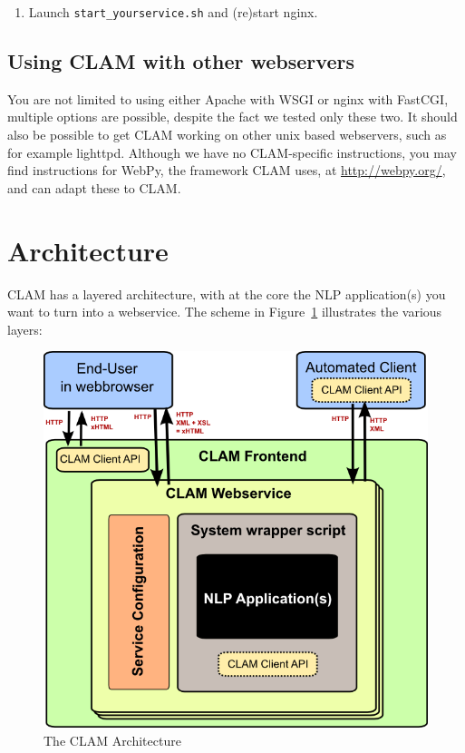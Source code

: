 \documentclass[a4paper,12pt]{report}
\begin{document}
\begin{enumerate}
\begin{verbatim}
 location /static/ {
    root /path/to/clam;
    if (-f $request_filename) {
       rewrite ^/static/(.*)$  /static/$1 break;
    }
 }
\end{verbatim}
\item Launch \texttt{start\_yourservice.sh}  and (re)start nginx.
\end{enumerate}


\subsection{Using CLAM with other webservers}

You are not limited to using either Apache with WSGI or nginx with FastCGI, multiple options are possible, despite the fact we tested only these two. It should also be possible to get CLAM working on other unix based webservers, such as for example lighttpd. Although we have no CLAM-specific instructions, you may find instructions for WebPy, the framework CLAM uses, at \url{http://webpy.org/}, and can adapt these to CLAM.

\section{Architecture}

CLAM has a layered architecture, with at the core the NLP application(s) you want to turn into a webservice. The scheme in Figure~\ref{fig:arch} illustrates the various layers:

\begin{figure}[h]
\begin{center}
\includegraphics[width=130.0mm]{architecture.png}
\end{center}
\caption{The CLAM Architecture}
\label{fig:arch} 
\end{figure}
\end{document}
